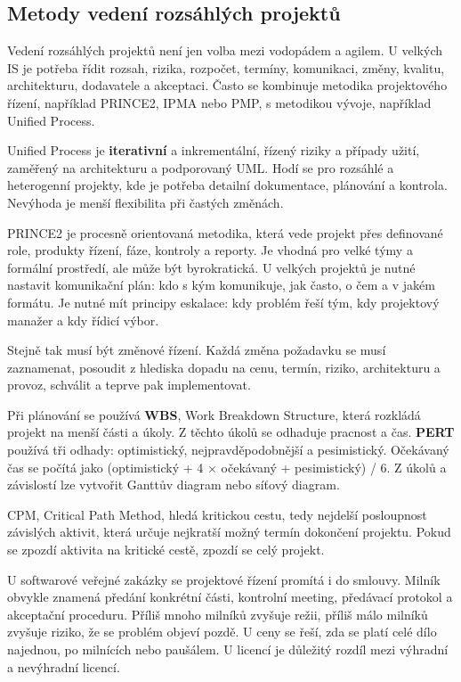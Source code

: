 \subsection*{Metody vedení rozsáhlých projektů}

Vedení rozsáhlých projektů není jen volba mezi vodopádem a agilem. U velkých IS je potřeba řídit rozsah, rizika, rozpočet, termíny, komunikaci, změny, kvalitu, architekturu, dodavatele a akceptaci. Často se kombinuje metodika projektového řízení, například PRINCE2, IPMA nebo PMP, s metodikou vývoje, například Unified Process.

Unified Process je \textbf{iterativní} a inkrementální, řízený riziky a případy užití, zaměřený na architekturu a podporovaný UML. Hodí se pro rozsáhlé a heterogenní projekty, kde je potřeba detailní dokumentace, plánování a kontrola. Nevýhoda je menší flexibilita při častých změnách.

PRINCE2 je procesně orientovaná metodika, která vede projekt přes definované role, produkty řízení, fáze, kontroly a reporty. Je vhodná pro velké týmy a formální prostředí, ale může být byrokratická. U velkých projektů je nutné nastavit komunikační plán: kdo s kým komunikuje, jak často, o čem a v jakém formátu. Je nutné mít principy eskalace: kdy problém řeší tým, kdy projektový manažer a kdy řídicí výbor.

Stejně tak musí být změnové řízení. Každá změna požadavku se musí zaznamenat, posoudit z hlediska dopadu na cenu, termín, riziko, architekturu a provoz, schválit a teprve pak implementovat.

Při plánování se používá \textbf{WBS}, Work Breakdown Structure, která rozkládá projekt na menší části a úkoly. Z těchto úkolů se odhaduje pracnost a čas. \textbf{PERT} používá tři odhady: optimistický, nejpravděpodobnější a pesimistický. Očekávaný čas se počítá jako (optimistický + 4 $\times$ očekávaný + pesimistický) / 6. Z úkolů a závislostí lze vytvořit Ganttův diagram nebo síťový diagram.

CPM, Critical Path Method, hledá kritickou cestu, tedy nejdelší posloupnost závislých aktivit, která určuje nejkratší možný termín dokončení projektu. Pokud se zpozdí aktivita na kritické cestě, zpozdí se celý projekt.

U softwarové veřejné zakázky se projektové řízení promítá i do smlouvy. Milník obvykle znamená předání konkrétní části, kontrolní meeting, předávací protokol a akceptační proceduru. Příliš mnoho milníků zvyšuje režii, příliš málo milníků zvyšuje riziko, že se problém objeví pozdě. U ceny se řeší, zda se platí celé dílo najednou, po milnících nebo paušálem. U licencí je důležitý rozdíl mezi výhradní a nevýhradní licencí.

